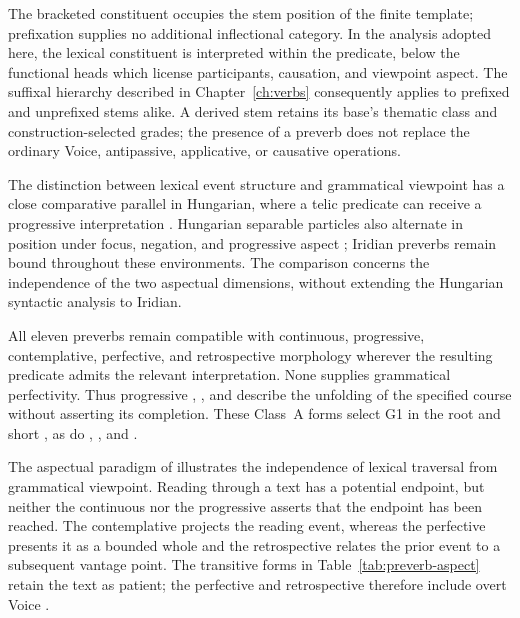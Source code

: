 The bracketed constituent occupies the stem position of the finite template;
prefixation supplies no additional inflectional category. In the analysis
adopted here, the lexical constituent is interpreted within the predicate,
below the functional heads which license participants, causation, and viewpoint
aspect. The suffixal hierarchy described in Chapter~\ref{ch:verbs} consequently
applies to prefixed and unprefixed stems alike. A derived stem retains its
base's thematic class and construction-selected grades; the presence of a
preverb does not replace the ordinary Voice, antipassive, applicative, or
causative operations.

The distinction between lexical event structure and grammatical viewpoint has
a close comparative parallel in Hungarian, where a telic predicate can receive
a progressive interpretation \cite{kardosfarkas2022}. Hungarian
separable particles also alternate in position under focus, negation, and
progressive aspect \cite{kardosfarkas2022}; Iridian preverbs remain
bound throughout these environments. The comparison concerns the independence
of the two aspectual dimensions, without extending the Hungarian syntactic
analysis to Iridian.

All eleven preverbs remain compatible with continuous, progressive, contemplative,
perfective, and retrospective morphology wherever the resulting predicate
admits the relevant interpretation. None supplies grammatical perfectivity.
Thus progressive  ,
 , and
  describe the unfolding of the
specified course without asserting its completion. These Class~A forms select
G1 in the root and short , as do
, , and .

The aspectual paradigm of  illustrates the independence of
lexical traversal from grammatical viewpoint. Reading through a text has a
potential endpoint, but neither the continuous nor the progressive asserts
that the endpoint has been reached. The contemplative projects the reading
event, whereas the perfective presents it as a bounded whole and the
retrospective relates the prior event to a subsequent vantage point. The
transitive forms in Table~\ref{tab:preverb-aspect} retain the text as patient;
the perfective and retrospective therefore include overt Voice .

